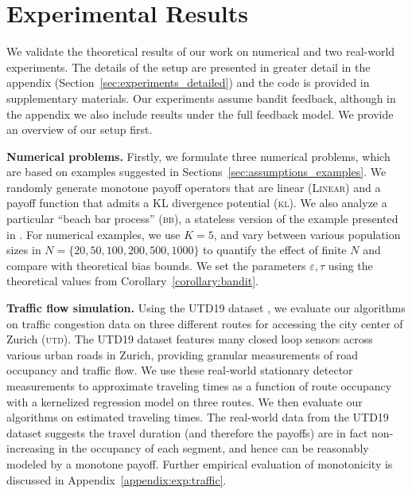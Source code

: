 
\section{Experimental Results}\label{sec:experiments_main}

We validate the theoretical results of our work on numerical and two real-world experiments.
The details of the setup are presented in greater detail in the appendix (Section~\ref{sec:experiments_detailed}) and the code is provided in supplementary materials.
Our experiments assume bandit feedback, although in the appendix we also include results under the full feedback model.
We provide an overview of our setup first.

\textbf{Numerical problems.}
Firstly, we formulate three numerical problems, which are based on examples suggested in Sections~\ref{sec:assumptions_examples}.
We randomly generate monotone payoff operators that are linear (\textsc{Linear}) and a payoff function that admits a KL divergence potential (\textsc{kl}).
We also analyze a particular ``beach bar process'' (\textsc{bb}), a stateless version of the example presented in \citep{perrin2020fictitious}.
For numerical examples, we use $K=5$, and vary between various population sizes in $N=\{20,50,100, 200, 500, 1000\}$ to quantify the effect of finite $N$ and compare with theoretical bias bounds.
We set the parameters $\varepsilon, \tau$ using the theoretical values from Corollary~\ref{corollary:bandit}.

\textbf{Traffic flow simulation.}
Using the UTD19 dataset \citep{loder2019understanding}, we evaluate our algorithms on traffic congestion data on three different routes for accessing the city center of Zurich (\textsc{utd}).
The UTD19 dataset features many closed loop sensors across various urban roads in Zurich, providing granular measurements of road occupancy and traffic flow.
We use these real-world stationary detector measurements to approximate traveling times as a function of route occupancy with a kernelized regression model on three routes.
We then evaluate our algorithms on estimated traveling times.
The real-world data from the UTD19 dataset suggests the travel duration (and therefore the payoffs) are in fact non-increasing in the occupancy of each segment, and hence can be reasonably modeled by a monotone payoff.
Further empirical evaluation of monotonicity is discussed in Appendix~\ref{appendix:exp:traffic}.

